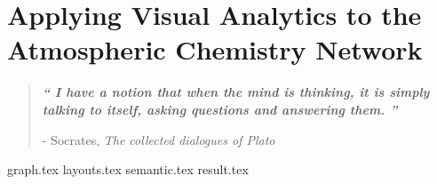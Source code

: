 

\chapter{Applying Visual Analytics to the Atmospheric Chemistry Network}\label{ch3}


\blankpage
\restoregeometry
\vspace*{0.15\paperheight}



\begin{center}
\begin{quotation}
  \large{\emph{\textbf{`` I have a notion that when the mind is thinking, it is simply talking to itself, asking questions and answering them. ''} }  }  \\
  \begin{flushright}
  - Socrates, \textit{The collected dialogues of Plato} 
  \end{flushright}
 \end{quotation}
\end{center}
\doublespacing
\newpage

% 
 
{graph.tex}
{layouts.tex}
{semantic.tex}
{result.tex}
 
\chapterbib






